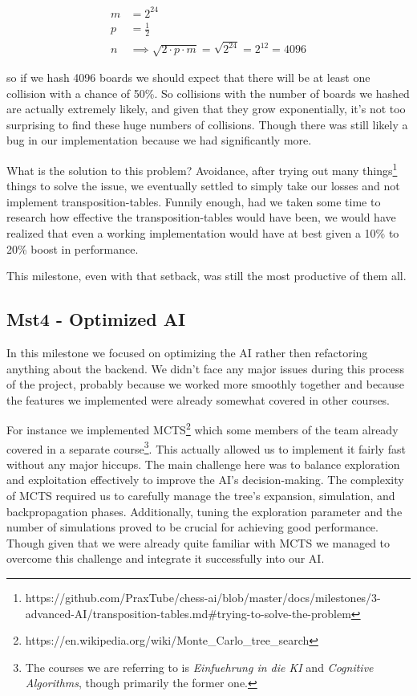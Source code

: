 \begin{align*}
m &= 2^{24} \\
p &= \frac{1}{2} \\
n &\implies \sqrt{2 \cdot p \cdot m} = \sqrt{2^{24}} = 2^{12} = 4096
\end{align*}

so if we hash 4096 boards we should expect that there
will be at least one collision with a chance of 50\%.
So collisions with the number of boards we hashed are actually extremely likely,
and given that they grow exponentially,
it's not too surprising to find these huge numbers of collisions.
Though there was still likely a bug in our implementation
because we had significantly more.

What is the solution to this problem?
Avoidance, after trying out many
things\footnote{https://github.com/PraxTube/chess-ai/blob/master/docs/milestones/3-advanced-AI/transposition-tables.md\#trying-to-solve-the-problem}
things to solve the issue,
we eventually settled to simply take our losses and not implement transposition-tables.
Funnily enough, had we taken some time to research how effective the transposition-tables
would have been, we would have realized that even a working implementation would
have at best given a 10\% to 20\% boost in performance.

This milestone, even with that setback, was still the most productive
of them all.

\subsection{Mst4 - Optimized AI}

In this milestone we focused on optimizing the AI rather
then refactoring anything about the backend. We didn't face any major
issues during this process of the project, probably
because we worked more smoothly together and because
the features we implemented were already somewhat
covered in other courses.

For instance we implemented
MCTS\footnote{https://en.wikipedia.org/wiki/Monte\_Carlo\_tree\_search}
which some members of the team already covered in a separate
course\footnote{The courses we are referring to is \textit{Einfuehrung in die KI}
and \textit{Cognitive Algorithms}, though primarily the former one.}.
This actually allowed us to implement it fairly fast without any major hiccups.
The main challenge here was to balance exploration and exploitation effectively
to improve the AI's decision-making.
The complexity of MCTS required us to carefully manage the tree's expansion,
simulation, and backpropagation phases.
Additionally, tuning the exploration parameter
and the number of simulations proved to be crucial for achieving good performance.
Though given that we were already quite familiar with MCTS
we managed to overcome this challenge and integrate it successfully into our AI.

